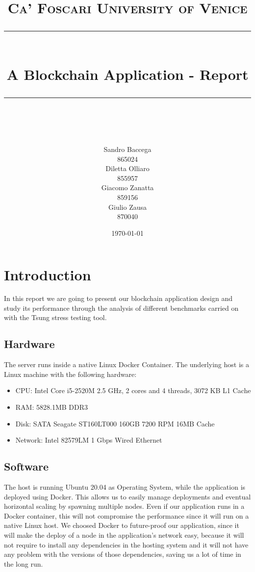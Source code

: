 \documentclass[11pt]{scrartcl} %
\title{	
	\normalfont\normalsize
	\textsc{Ca' Foscari University of Venice}\\ %
	\vspace{25pt} %
	\rule{\linewidth}{0.5pt}\\ %
	\vspace{20pt} %
	{\huge A Blockchain Application - Report}\\ %
	\vspace{12pt} %
	\rule{\linewidth}{2pt}\\ %
	\vspace{12pt} %
}
\author{\hspace{-0.8cm} \parbox{4cm}{\centering
  Sandro Baccega\\ 865024} \parbox{4cm}{\centering
  Diletta Olliaro\\ 855957} \parbox{4cm}{\centering
  Giacomo Zanatta\\ 859156} \parbox{4cm}{\centering Giulio Zausa\\ 870040} } %
\date{\vspace{20pt}\today} %
\begin{document}
\maketitle %



\section{Introduction}

In this report we are going to present our blockchain application design and  study its performance through the analysis of different benchmarks carried on with the Tsung stress testing tool.

\subsection{Hardware}
The server runs inside a native Linux Docker Container. The underlying host is a Linux machine with the following hardware:
\begin{itemize}
\item[\adforn{43}] CPU: Intel Core i5-2520M 2.5 GHz, 2 cores and 4 threads, 3072 KB L1 Cache
\item[\adforn{43}] RAM: 5828.1MB DDR3
\item[\adforn{43}] Disk: SATA Seagate ST160LT000 160GB 7200 RPM 16MB Cache
\item[\adforn{43}] Network: Intel 82579LM 1 Gbps Wired Ethernet
\end{itemize}

\subsection{Software}

The host is running Ubuntu 20.04 as Operating System, while the application is deployed using Docker. 
This allows us to easily manage deployments and eventual horizontal scaling by spawning multiple nodes. 
Even if our application runs in a Docker container, this will not compromise the performance since it will run on a native Linux host. 
We choosed Docker to future-proof our application, since it will make the deploy of a node in the application's network easy, because it will not require to install any dependencies in the hosting system and it will not have any problem with the versions of those dependencies, saving us a lot of time in the long run.
\end{document}
